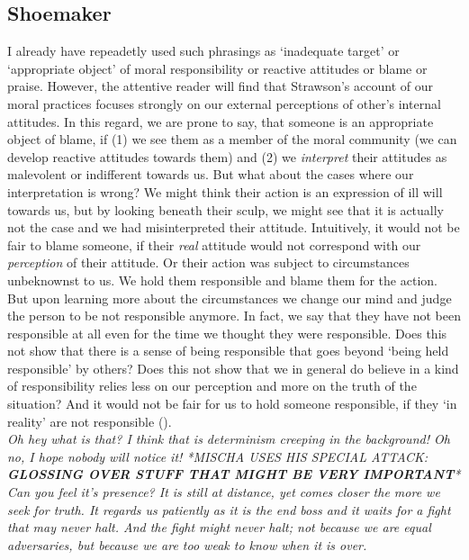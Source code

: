 \documentclass{article}
\begin{document}
\subsection{Shoemaker}

 I already have repeadetly used such phrasings as `inadequate target' or
 `appropriate object' of moral responsibility or reactive attitudes or blame or
 praise. However, the attentive reader will find that Strawson's account of our
 moral practices focuses strongly on our external perceptions of other's
 internal attitudes. In this regard, we are prone to say, that someone is an
 appropriate object of blame, if (1) we see them as a member of the moral
 community (we can develop reactive attitudes towards them) and (2) we
 \textit{interpret} their attitudes as malevolent or indifferent towards us. But what
 about the cases where our interpretation is wrong? We might think their action
 is an expression of ill will towards us, but by looking beneath their sculp, we
 might see that it is actually not the case and we had misinterpreted their
 attitude. Intuitively, it would not be fair to blame someone, if their \textit{real}
 attitude would not correspond with our \textit{perception} of their attitude.
 Or their action was subject to circumstances unbeknownst to us. We hold them
 responsible and blame them for the action. But upon learning more about the
 circumstances we change our mind and judge the person to be not responsible
 anymore. In fact, we say that they have not been responsible at all even for the
 time we thought they were responsible. Does this not show that there is a sense
 of being responsible that goes beyond `being held responsible' by others? Does
 this not show that we in general do believe in a kind of responsibility relies
 less on our perception and more on the truth of the situation? And it would not
 be fair for us to hold someone responsible, if they `in reality' are not
 responsible (\cite[p. 472]{Smith_2007}).\\
 \textit{Oh hey what is that? I think that is determinism creeping in the
	 background! Oh no, I hope nobody will notice it! *MISCHA USES HIS
 SPECIAL ATTACK: \textbf{GLOSSING OVER STUFF THAT MIGHT BE VERY IMPORTANT}*}\\

 \textit{Can you feel it's presence? It is still at distance, yet comes closer the more we
 seek for truth. It regards us patiently as it is the end boss and it waits for
 a fight that may never halt. And the fight might never halt; not because we are
 equal adversaries, but because we are too weak to know when it is over.}
\end{document}
